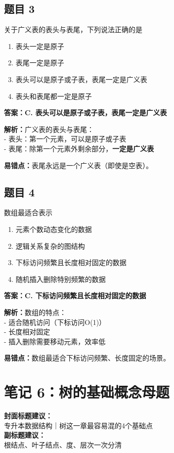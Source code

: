 \documentclass[12pt,a4paper]{ctexart}
\begin{document}
\subsection*{题目 3}
关于广义表的表头与表尾，下列说法正确的是
\begin{enumerate}[label=\Alph*.]
	\item 表头一定是原子
	\item 表尾一定是原子
	\item 表头可以是原子或子表，表尾一定是广义表
	\item 表头和表尾都一定是原子
\end{enumerate}

\begin{answerbox}
	\textbf{答案：C. 表头可以是原子或子表，表尾一定是广义表}

	\textbf{解析：}广义表的表头与表尾：\\
	- 表头：第一个元素，可以是原子或子表\\
	- 表尾：除第一个元素外剩余部分，\textbf{一定是广义表}

	\textbf{易错点：}表尾永远是一个广义表（即使是空表）。
\end{answerbox}

\subsection*{题目 4}
数组最适合表示
\begin{enumerate}[label=\Alph*.]
	\item 元素个数动态变化的数据
	\item 逻辑关系复杂的图结构
	\item 下标访问频繁且长度相对固定的数据
	\item 随机插入删除特别频繁的数据
\end{enumerate}

\begin{answerbox}
	\textbf{答案：C. 下标访问频繁且长度相对固定的数据}

	\textbf{解析：}数组的特点：\\
	- 适合随机访问（下标访问O(1)）\\
	- 长度相对固定\\
	- 插入删除需要移动元素，效率低

	\textbf{易错点：}数组最适合下标访问频繁、长度固定的场景。
\end{answerbox}

\newpage

\section{笔记 6：树的基础概念母题}
\begin{coverbox}
	\textbf{封面标题建议：}\\
	专升本数据结构｜树这一章最容易混的4个基础点\\
	\textbf{副标题建议：}\\
	根结点、叶子结点、度、层次一次分清
\end{coverbox}
\end{document}
